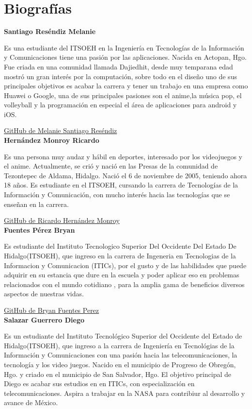 \documentclass[conference]{IEEEtran}
\begin{document}
\section{Biografías}

\textbf{Santiago Reséndiz Melanie}

Es una estudiante del ITSOEH en la Ingeniería en Tecnologías de la Información y Comunicaciones tiene una pasión por las aplicaciones. Nacida en Actopan, Hgo.  Fue criada en una comunidad llamada Dajiedhit, desde muy temparana edad mostró un gran interés por la computación, sobre todo en el diseño uno de sus principales objetivos es acabar la carrera y tener un trabajo en una empresa como Huawei o Google, una de sus principales pasiones son el anime,la música pop, el volleyball y la programación en especial el área de aplicaciones para android y iOS.

\href{https://github.com/melaniesantiago}{GitHub de Melanie Santiago Reséndiz} 
\\

\textbf{Hernández Monroy Ricardo}

Es una persona muy audaz y hábil en deportes, interesado por los videojuegos y el anime. Actualmente, se crió y nació en las Presas de la comunidad de Tezontepec de Aldama, Hidalgo. Nació el 6 de noviembre de 2005, teniendo ahora 18 años. Es estudiante en el ITSOEH, cursando la carrera de Tecnologías de la Información y Comunicación, con mucho interés hacia las tecnologías que se enseñan en la carrera.

\href{https://github.com/ricardohernandez21}{GitHub de Ricardo Hernández Monroy}
\\

\textbf{Fuentes Pérez Bryan}

Es estudiante del Instituto Tecnologico Superior Del Occidente Del Estado De Hidalgo(ITSOEH), que ingreso en la carrera de Ingeneria en Tecnologias de la Informacion y Comunicacion (ITICs), por el gusto y de las habilidades que puede adquirir en su estancia que dure en la escuela y poder aplicar eso en problemas relacionados con el mundo cotidiano , para la amplia gama de beneficios diversos aspectos de nuestras vidas.

 \href{https://github.com/bryanfpp}{GitHub de Bryan Fuentes Perez}
 \\
 
\textbf{Salazar Guerrero Diego}

 Es un estudiante del Instituto Tecnológico Superior del Occidente del Estado de Hidalgo(ITSOEH), que ingreso a la carrera de Ingeniería en Tecnológias de la Información y Comunicaciones con una pasión hacia las telecomunicaciones, la tecnología y los video juegos. Nacido en el municipio de Progreso de Obregón, Hgo. y criado en el municipio de San Salvador, Hgo. El objetivo principal de Diego es acabar sus estudios en en ITICs, con especialización en telecomunicaciones. Aspira a trabajar en la NASA para contribiur al desarrollo y avance de México.
 
\end{document}
